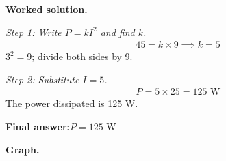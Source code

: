 \documentclass[11pt]{article}
\begin{document}
\textbf{Worked solution.}

\textit{Step 1: Write \( P = kI^2 \) and find \( k \).}
\[\begin{gathered}
45 = k \times 9 \implies k = 5
\end{gathered}\]
\( 3^2 = 9 \); divide both sides by 9.

\textit{Step 2: Substitute \( I = 5 \).}
\[\begin{gathered}
P = 5 \times 25 = 125 \text{ W}
\end{gathered}\]
The power dissipated is 125 W.

\begin{answerbox}
\textbf{Final answer:}\quad \(\displaystyle  P = 125 \) W
\end{answerbox}
\textbf{Graph.}

\begin{center}
\end{center}
\end{document}
